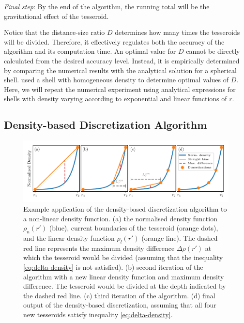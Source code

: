 \documentclass[extra, referee]{gji}
\begin{document}
\textit{Final step}:
By the end of the algorithm, the running total will be the gravitational effect of the
tesseroid.

Notice that the distance-size ratio $D$ determines how many
times the tesseroids will be divided.
Therefore, it effectively regulates both the accuracy of the algorithm and its
computation time.
An optimal value for $D$ cannot be directly calculated from the desired accuracy level.
Instead, it is empirically determined by comparing the numerical results with the
analytical solution for a spherical shell.
\citet{Uieda2016} used a shell with homogeneous density to determine optimal values of
$D$.
Here, we will repeat the numerical experiment using analytical expressions for shells
with density varying according to exponential and linear functions of $r$.


\subsection{Density-based Discretization Algorithm}

\begin{figure}
\centering
\includegraphics[width=\linewidth]
    {figures/density-based-discretization-algorithm.pdf}
\caption{
    Example application of the density-based discretization algorithm to a non-linear
    density function.
    (a) the normalised density function $\rho_n(r')$ (blue), current boundaries of the
    tesseroid (orange dots), and the linear density function $\rho_l(r')$ (orange line).
    The dashed red line represents the maximum density difference $\Delta \rho (r')$ at
    which the tesseroid would be divided (assuming that the inequality
    \ref{eq:delta-density} is not satisfied).
    (b) second iteration of the algorithm with a new linear density function and maximum
    density difference. The tesseroid would be divided at the depth indicated by the
    dashed red line.
    (c) third iteration of the algorithm.
    (d) final output of the density-based discretization, assuming that all four new
    tesseroids satisfy inequality \ref{eq:delta-density}.
}
\label{fig:density-discretization-algorithm}
\end{figure}
\end{document}
